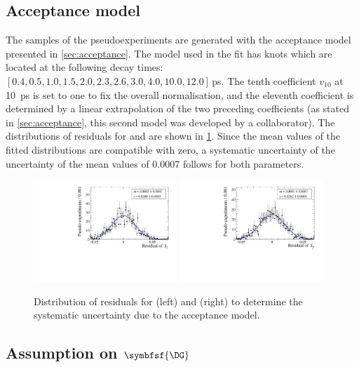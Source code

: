 \subsection*{Acceptance model}

The samples of the pseudoexperiments are generated with the acceptance model presented in \cref{sec:acceptance}.
The model used in the fit has knots which are located at the following decay times: $[0.4, 0.5, 1.0, 1.5, 2.0, 2.3, 2.6, 3.0, 4.0, 10.0, 12.0]\,$\si{\pico\second}.
The tenth coefficient $v_{10}$ at \SI{10}{\pico\second} is set to one to fix the overall normalisation, and the eleventh coefficient is determined by a linear extrapolation of the two preceding coefficients (as stated in \cref{sec:acceptance}, this second model was developed by a collaborator).
The distributions of residuals for \Sf and \Sfbar are shown in \cref{fig:systUncertAcc}.
Since the mean values of the fitted distributions are compatible with zero, a systematic uncertainty of the uncertainty of the mean values of  \num{0.0007} follows for both \CP parameters.
\begin{figure}[tbp]
    \centering
    \includegraphics[width=0.48\textwidth]{11Systematics/figs/accept_Sf_res.pdf}
    \includegraphics[width=0.48\textwidth]{11Systematics/figs/accept_Sfbar_res.pdf}
    \caption{Distribution of residuals for \Sf (left) and \Sfbar (right) to determine the systematic uncertainty due to the acceptance model.}
    \label{fig:systUncertAcc}
\end{figure}

\subsection*{Assumption on $\symbfsf{\DG}$}

